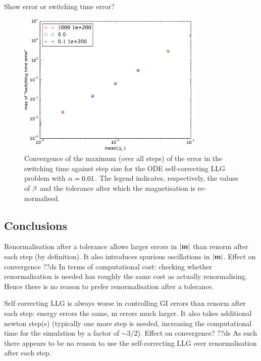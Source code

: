 Show error or switching time error?
\begin{figure}
  \centering
  \includegraphics[width=0.8\textwidth]{plots/self_correcting_llg_ode_convergence/maxofswitchingtimeerrorvsmeanofdts}
  \caption{
    Convergence of the maximum (over all steps) of the error in the switching time
    against step size
    for the ODE self-correcting LLG problem with
    $\alpha = 0.01$.
    The legend indicates, respectively, the values of $\beta$ and the tolerance after which the magnetisation is re-normalised.
  }
  \label{fig:sc-convergence}
\end{figure}

\subsection{Conclusions}

Renormalisation after a tolerance allows larger errors in $\left|{\boldsymbol{\mathrm{m}}} \right|$ than renorm after each step (by definition).
It also introduces spurious oscillations in $\left|{\boldsymbol{\mathrm{m}}} \right|$.
Effect on convergence ??ds
In terms of computational cost: checking whether renormalisation is needed has roughly the same cost as actually renormalising.
Hence there is no reason to prefer renormalisation after a tolerance.


Self correcting LLG is always worse in controlling GI errors than renorm after each step: energy errors the same, m errors much larger.
It also takes additional newton step(s) (typically one more step is needed, increasing the computational time for the simulation by a factor of $\sim 3/2$).
Effect on convergence? ??ds
As such there appears to be no reason to use the self-correcting LLG over renormalisation after each step.

